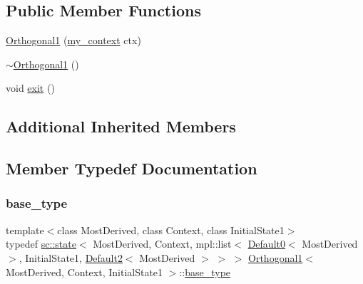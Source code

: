 \subsection*{Public Member Functions}
\begin{DoxyCompactItemize}
\item 
\mbox{\hyperlink{struct_orthogonal1_acbb5711e5434d30316340781fec8fc22}{Orthogonal1}} (\mbox{\hyperlink{struct_orthogonal1_a8cee9db1dad468ee5f8e34871d7a4ae2}{my\+\_\+context}} ctx)
\item 
\mbox{\hyperlink{struct_orthogonal1_ae085dfe6ebfd6616166973e0f4338d6a}{$\sim$\+Orthogonal1}} ()
\item 
void \mbox{\hyperlink{struct_orthogonal1_adaf5bf49d76b33cc8f1e5a2e707626a7}{exit}} ()
\end{DoxyCompactItemize}
\subsection*{Additional Inherited Members}


\subsection{Member Typedef Documentation}
\mbox{\label{struct_orthogonal1_a2658c641be88f6894b543e14a3102447}} 
\subsubsection{\texorpdfstring{base\+\_\+type}{base\_type}}
{\footnotesize\ttfamily template$<$class Most\+Derived, class Context, class Initial\+State1$>$ \\
typedef \mbox{\hyperlink{classboost_1_1statechart_1_1state}{sc\+::state}}$<$ Most\+Derived, Context, mpl\+::list$<$ \mbox{\hyperlink{struct_default0}{Default0}}$<$ Most\+Derived $>$, Initial\+State1, \mbox{\hyperlink{struct_default2}{Default2}}$<$ Most\+Derived $>$ $>$ $>$ \mbox{\hyperlink{struct_orthogonal1}{Orthogonal1}}$<$ Most\+Derived, Context, Initial\+State1 $>$\+::\mbox{\hyperlink{struct_orthogonal1_a2658c641be88f6894b543e14a3102447}{base\+\_\+type}}}

\mbox{\label{struct_orthogonal1_a14beb6cc5bb2d03c3fe75d554a09a0a9}} 
